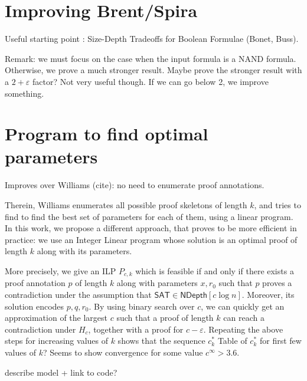 \documentclass[a4paper, 11pt]{article}
\theoremstyle{plain}
\theoremstyle{definition}
\theoremstyle{remark}
\newcommand{\eps}{\varepsilon}%
\newcommand{\SAT}{\textsf{SAT}}%
\newcommand{\NAND}{\textsf{NAND}}%
\newcommand{\ND}{\textsf{NDepth}}%
\newcommand{\NDL}[1]{\ND[ #1 \log n]}%
\newcommand{\todohere}{\todo[inline]{TODO}}%
\begin{document}
\section{Improving Brent/Spira}
Useful starting point : Size-Depth Tradeoffs for Boolean Formulae (Bonet, Buss).

Remark: we must focus on the case when the input formula is a \NAND{} formula.
Otherwise, we prove a much stronger result.
Maybe prove the stronger result with a $2+\eps$ factor? Not very useful though.
If we can go below 2, we improve something.


\appendix
\section{Program to find optimal parameters}\label{app:ilp}
Improves over Williams (cite): no need to enumerate proof annotations.


Therein, Williams enumerates all possible proof skeletons of length $k$,
and tries to find to find the best set of parameters for each of them, using a linear program.
In this work, we propose a different approach, that proves to be more efficient in practice:
we use an Integer Linear program whose solution is
an optimal proof of length $k$
along with its parameters.

More precisely, we give an ILP $P_{c,k}$ which is feasible if and only if
there exists a proof annotation $p$ of length $k$ along with parameters $x, r_0$
such that $p$ proves a contradiction under the assumption that $\SAT\in\NDL{c}$.
Moreover, its solution encodes $p,q,r_0$.
By using binary search over $c$, we can quickly get an approximation 
of the largest $c$ such that a proof of length $k$ can reach a contradiction under $H_c$, together with a proof for $c-\eps$.
Repeating the above steps for increasing values of $k$ shows that the sequence $c_k^*$
Table of $c_k^*$ for first few values of $k$?
Seems to show convergence for some value $c^\infty > 3.6$.

\todohere describe model + link to code?




\end{document}
